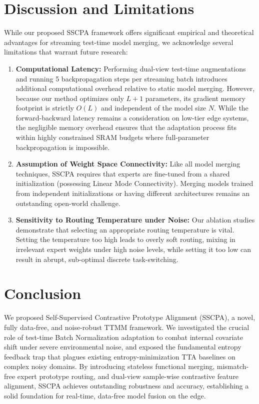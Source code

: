 \documentclass{article}
\theoremstyle{plain}
\theoremstyle{definition}
\theoremstyle{remark}
\begin{document}
\section{Discussion and Limitations}
\label{sec:discussion}
While our proposed SSCPA framework offers significant empirical and theoretical advantages for streaming test-time model merging, we acknowledge several limitations that warrant future research:
\begin{enumerate}
    \item \textbf{Computational Latency:} Performing dual-view test-time augmentations and running 5 backpropagation steps per streaming batch introduces additional computational overhead relative to static model merging. However, because our method optimizes only $L+1$ parameters, its gradient memory footprint is strictly $O(L)$ and independent of the model size $N$. While the forward-backward latency remains a consideration on low-tier edge systems, the negligible memory overhead ensures that the adaptation process fits within highly constrained SRAM budgets where full-parameter backpropagation is impossible.
    \item \textbf{Assumption of Weight Space Connectivity:} Like all model merging techniques, SSCPA requires that experts are fine-tuned from a shared initialization (possessing Linear Mode Connectivity). Merging models trained from independent initializations or having different architectures remains an outstanding open-world challenge.
    \item \textbf{Sensitivity to Routing Temperature under Noise:} Our ablation studies demonstrate that selecting an appropriate routing temperature is vital. Setting the temperature too high leads to overly soft routing, mixing in irrelevant expert weights under high noise levels, while setting it too low can result in abrupt, sub-optimal discrete task-switching.
\end{enumerate}

\section{Conclusion}
\label{sec:conclusion}
We proposed Self-Supervised Contrastive Prototype Alignment (SSCPA), a novel, fully data-free, and noise-robust TTMM framework. We investigated the crucial role of test-time Batch Normalization adaptation to combat internal covariate shift under severe environmental noise, and exposed the fundamental entropy feedback trap that plagues existing entropy-minimization TTA baselines on complex noisy domains. By introducing stateless functional merging, mismatch-free expert prototype routing, and dual-view sample-wise contrastive feature alignment, SSCPA achieves outstanding robustness and accuracy, establishing a solid foundation for real-time, data-free model fusion on the edge.
\end{document}
